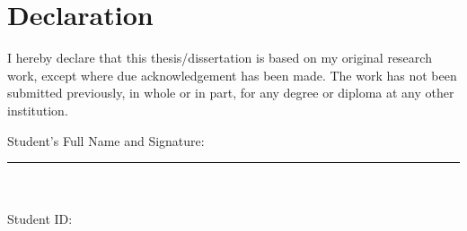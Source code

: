 \chapter*{Declaration}

I hereby declare that this thesis/dissertation is based on my original research work, except where due acknowledgement has been made. The work has not been submitted previously, in whole or in part, for any degree or diploma at any other institution.

\vspace{2cm}
\noindent Student's Full Name and Signature:

\vspace{1.2cm}
\noindent\rule{8cm}{0.4pt}\\
\studentname\\
Student ID: \studentid
